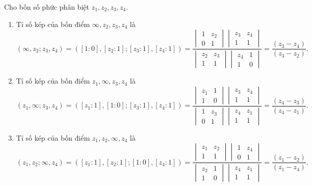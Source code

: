 \begin{exam*}
    Cho bốn số phức phân biệt $z_1,z_2,z_3,z_4$.
    \begin{enumerate}
        \item Tỉ số kép của bốn điểm $\infty, z_2,z_3,z_4$ là 
        \[(\infty, z_2;z_3,z_4) = ([1:0],[z_2:1];[z_3:1],[z_4:1])=\dfrac{\begin{vmatrix}
         1 & z_2\\
         0 & 1
    \end{vmatrix}\begin{vmatrix}
         z_3 & z_4\\
         1 & 1
    \end{vmatrix}}{\begin{vmatrix}
         z_2 & z_3\\
         1 & 1
    \end{vmatrix}\begin{vmatrix}
         z_4 & 1\\
         1 & 0
    \end{vmatrix}} = \dfrac{(z_3-z_4)}{(z_3-z_2)}.\]

    \item Tỉ số kép của bốn điểm $z_1,\infty,z_3,z_4$ là 
        \[(z_1,\infty;z_3,z_4) = ([z_1:1],[1:0];[z_3:1],[z_4:1])=\dfrac{\begin{vmatrix}
         z_1 & 1\\
         1 & 0
    \end{vmatrix}\begin{vmatrix}
         z_3 & z_4\\
         1 & 1
    \end{vmatrix}}{\begin{vmatrix}
         1 & z_3\\
         0 & 1
    \end{vmatrix}\begin{vmatrix}
         z_4 & z_1\\
         1 & 1
    \end{vmatrix}} = \dfrac{(z_4-z_3)}{(z_4-z_1)}.\]

    \item Tỉ số kép của bốn điểm $z_1,z_2,\infty,z_4$ là 
        \[(z_1,z_2;\infty,z_4) = ([z_1:1],[z_2:1];[1:0],[z_4:1])=\dfrac{\begin{vmatrix}
         z_1 & z_2\\
         1 & 1
    \end{vmatrix}\begin{vmatrix}
         1 & z_4\\
         0 & 1
    \end{vmatrix}}{\begin{vmatrix}
         z_2 & 1\\
         1 & 0
    \end{vmatrix}\begin{vmatrix}
         z_4 & z_1\\
         1 & 1
    \end{vmatrix}} = \dfrac{(z_1-z_2)}{(z_1-z_4)}.\]


\end{enumerate}
\end{exam*}
